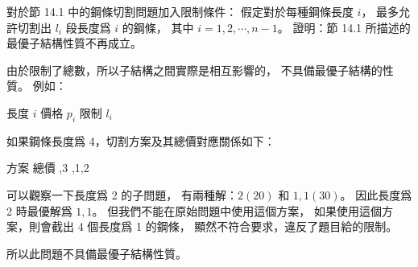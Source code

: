\startEXERCISE
對於節 14.1 中的鋼條切割問題加入限制條件：
假定對於每種鋼條長度 $i$，
最多允許切割出 $l_i$ 段長度爲 $i$ 的鋼條，
其中 $i=1,2,\cdots,n-1$。
證明：節 14.1 所描述的最優子結構性質不再成立。
\stopEXERCISE

\startANSWER
由於限制了總數，所以子結構之間實際是相互影響的，
不具備最優子結構的性質。
例如：

\bTABLE[align=center]
\bTR \bTD 長度 $i$   \eTD {} \eTD {} \eTD {} \eTD {} \eTD\eTR
\bTR \bTD 價格 $p_i$ \eTD {} \eTD {}\eTD {}\eTD {}\eTD\eTR
\bTR \bTD 限制 $l_i$ \eTD {}\eTD {}\eTD {}\eTD {}\eTD\eTR
\eTABLE

如果鋼條長度爲 4，切割方案及其總價對應關係如下：

\bTABLE[align=center]
\bTR \bTD 方案   \eTD \bTD 總價 \eTD\eTR
\bTR {} \eTD {} \eTD\eTR
\bTR {},3 \eTD {}\eTD\eTR
\bTR {},1,2 \eTD {}\eTD\eTR
\eTABLE

可以觀察一下長度爲 2 的子問題，
有兩種解：$2(20)$ 和 $1,1(30)$。
因此長度爲 2 時最優解爲 $1,1$。
但我們不能在原始問題中使用這個方案，
如果使用這個方案，則會截出 4 個長度爲 1 的鋼條，
顯然不符合要求，違反了題目給的限制。

所以此問題不具備最優子結構性質。
\stopANSWER

